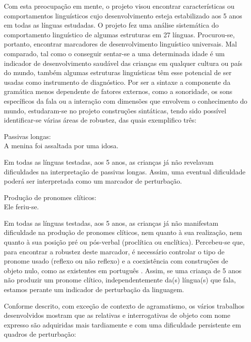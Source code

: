 \documentclass[output=paper,colorlinks,citecolor=brown,booklanguage=portuguese]{langscibook}
\begin{document}
Com esta preocupação em mente, o projeto visou encontrar características ou comportamentos linguísticos cujo desenvolvimento esteja estabilizado aos 5 anos em todas as línguas estudadas. O projeto fez uma análise sistemática do comportamento linguístico de algumas estruturas em 27 línguas. Procurou-se, portanto, encontrar marcadores de desenvolvimento linguístico universais. Mal comparado, tal como o conseguir sentar-se a uma determinada idade é um indicador de desenvolvimento saudável das crianças em qualquer cultura ou país do mundo, também algumas estruturas linguísticas têm esse potencial de ser usadas como instrumento de diagnóstico. Por ser a sintaxe a componente da gramática menos dependente de fatores externos, como a sonoridade, os sons específicos da fala ou a interação com dimensões que envolvem o conhecimento do mundo, estudaram-se no projeto construções sintáticas, tendo sido possível identificar-se várias áreas de robustez, das quais exemplifico três:

\ea\label{ex:cap2ex31} Passivas longas:\\
    A menina foi assaltada por uma idosa.
\z

Em todas as línguas testadas, aos 5 anos, as crianças já não revelavam dificuldades na interpretação de passivas longas. Assim, uma eventual dificuldade poderá ser interpretada como um marcador de perturbação.

\ea\label{ex:cap2ex32} Produção de pronomes clíticos:\\
    Ele feriu-se.
\z

Em todas as línguas testadas, aos 5 anos, as crianças já não manifestam dificuldade na produção de pronomes clíticos, nem quanto à sua realização, nem quanto à sua posição pré ou pós-verbal (proclítica ou enclítica). Percebeu-se que, para encontrar a robustez deste marcador, é necessário controlar o tipo de pronome usado (reflexo ou não reflexo) e a coexistência com construções de objeto nulo, como as existentes em português \citep{Varlokosta2015}. Assim, se uma criança de 5 anos não produzir um pronome clítico, independentemente da(s) língua(s) que fala, estamos perante um indicador de perturbação da linguagem.


Conforme descrito, com exceção de contexto de agramatismo, os vários trabalhos desenvolvidos mostram que as relativas e interrogativas de objeto com nome expresso  são adquiridas mais tardiamente e com uma dificuldade persistente em quadros de perturbação:
\end{document}
